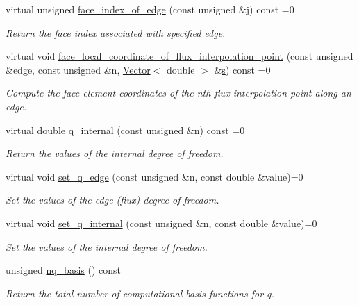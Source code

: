 \begin{DoxyCompactItemize}
virtual unsigned \hyperlink{classoomph_1_1DarcyEquations_ae1ab5c1d06efe95dfd2db523c6f34eb9}{face\+\_\+index\+\_\+of\+\_\+edge} (const unsigned \&j) const =0
\begin{DoxyCompactList}\small\item\em Return the face index associated with specified edge. \end{DoxyCompactList}\item 
virtual void \hyperlink{classoomph_1_1DarcyEquations_a7597d6d7e22f97fd2a6f4ab811dd2b72}{face\+\_\+local\+\_\+coordinate\+\_\+of\+\_\+flux\+\_\+interpolation\+\_\+point} (const unsigned \&edge, const unsigned \&n, \hyperlink{classoomph_1_1Vector}{Vector}$<$ double $>$ \&\hyperlink{cfortran_8h_ab7123126e4885ef647dd9c6e3807a21c}{s}) const =0
\begin{DoxyCompactList}\small\item\em Compute the face element coordinates of the nth flux interpolation point along an edge. \end{DoxyCompactList}\item 
virtual double \hyperlink{classoomph_1_1DarcyEquations_af92e9914e062e894514cca6a7cec0a26}{q\+\_\+internal} (const unsigned \&n) const =0
\begin{DoxyCompactList}\small\item\em Return the values of the internal degree of freedom. \end{DoxyCompactList}\item 
virtual void \hyperlink{classoomph_1_1DarcyEquations_a6e1c3c5e23d71d80b7976e61be0ae8e9}{set\+\_\+q\+\_\+edge} (const unsigned \&n, const double \&value)=0
\begin{DoxyCompactList}\small\item\em Set the values of the edge (flux) degree of freedom. \end{DoxyCompactList}\item 
virtual void \hyperlink{classoomph_1_1DarcyEquations_aafb7955f9dd5b433383ccff10f0fb7a0}{set\+\_\+q\+\_\+internal} (const unsigned \&n, const double \&value)=0
\begin{DoxyCompactList}\small\item\em Set the values of the internal degree of freedom. \end{DoxyCompactList}\item 
unsigned \hyperlink{classoomph_1_1DarcyEquations_abe00f95bb3c562a27799dd6dc3791c8c}{nq\+\_\+basis} () const
\begin{DoxyCompactList}\small\item\em Return the total number of computational basis functions for q. \end{DoxyCompactList}\item 

\end{DoxyCompactItemize}
